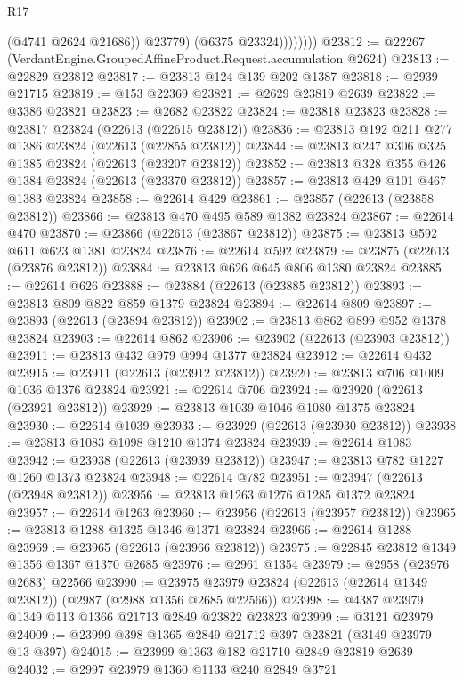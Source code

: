 \begin{lexlean}{R17}
\begin{coremodule}
                      (@4741 @2624 @21686))
                    @23779)
                  (@6375 @23324))))))))
@23812 := @22267 (VerdantEngine.GroupedAffineProduct.Request.accumulation @2624)
@23813 := @22829 @23812
@23817 := @23813 @124 @139 @202 @1387
@23818 := @2939 @21715
@23819 := @153 @22369
@23821 := @2629 @23819 @2639
@23822 := @3386 @23821
@23823 := @2682 @23822
@23824 := @23818 @23823
@23828 := @23817 @23824 (@22613 (@22615 @23812))
@23836 := @23813 @192 @211 @277 @1386 @23824 (@22613 (@22855 @23812))
@23844 := @23813 @247 @306 @325 @1385 @23824 (@22613 (@23207 @23812))
@23852 := @23813 @328 @355 @426 @1384 @23824 (@22613 (@23370 @23812))
@23857 := @23813 @429 @101 @467 @1383 @23824
@23858 := @22614 @429
@23861 := @23857 (@22613 (@23858 @23812))
@23866 := @23813 @470 @495 @589 @1382 @23824
@23867 := @22614 @470
@23870 := @23866 (@22613 (@23867 @23812))
@23875 := @23813 @592 @611 @623 @1381 @23824
@23876 := @22614 @592
@23879 := @23875 (@22613 (@23876 @23812))
@23884 := @23813 @626 @645 @806 @1380 @23824
@23885 := @22614 @626
@23888 := @23884 (@22613 (@23885 @23812))
@23893 := @23813 @809 @822 @859 @1379 @23824
@23894 := @22614 @809
@23897 := @23893 (@22613 (@23894 @23812))
@23902 := @23813 @862 @899 @952 @1378 @23824
@23903 := @22614 @862
@23906 := @23902 (@22613 (@23903 @23812))
@23911 := @23813 @432 @979 @994 @1377 @23824
@23912 := @22614 @432
@23915 := @23911 (@22613 (@23912 @23812))
@23920 := @23813 @706 @1009 @1036 @1376 @23824
@23921 := @22614 @706
@23924 := @23920 (@22613 (@23921 @23812))
@23929 := @23813 @1039 @1046 @1080 @1375 @23824
@23930 := @22614 @1039
@23933 := @23929 (@22613 (@23930 @23812))
@23938 := @23813 @1083 @1098 @1210 @1374 @23824
@23939 := @22614 @1083
@23942 := @23938 (@22613 (@23939 @23812))
@23947 := @23813 @782 @1227 @1260 @1373 @23824
@23948 := @22614 @782
@23951 := @23947 (@22613 (@23948 @23812))
@23956 := @23813 @1263 @1276 @1285 @1372 @23824
@23957 := @22614 @1263
@23960 := @23956 (@22613 (@23957 @23812))
@23965 := @23813 @1288 @1325 @1346 @1371 @23824
@23966 := @22614 @1288
@23969 := @23965 (@22613 (@23966 @23812))
@23975 := @22845 @23812 @1349 @1356 @1367 @1370 @2685
@23976 := @2961 @1354
@23979 := @2958 (@23976 @2683) @22566
@23990 := @23975 @23979 @23824 (@22613 (@22614 @1349 @23812)) (@2987 (@2988 @1356 @2685 @22566))
@23998 := @4387 @23979 @1349 @113 @1366 @21713 @2849 @23822 @23823
@23999 := @3121 @23979
@24009 := @23999 @398 @1365 @2849 @21712 @397 @23821 (@3149 @23979 @13 @397)
@24015 := @23999 @1363 @182 @21710 @2849 @23819 @2639
@24032 := @2997
    @23979
    @1360
    @1133
    @240
    @2849
    @3721

\end{coremodule}
\end{lexlean}
